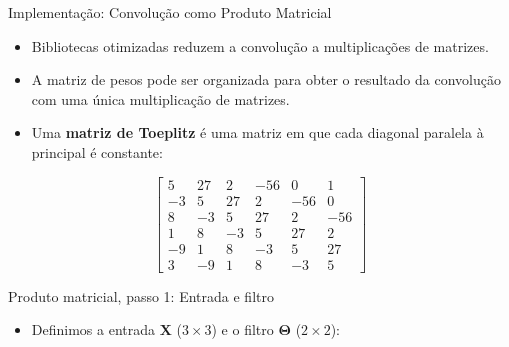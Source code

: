 \documentclass[aspectratio=169,xcolor=dvipsnames]{beamer}
\begin{document}
\begin{frame}{Implementação: Convolução como Produto Matricial}
\begin{itemize}
    \item Bibliotecas otimizadas reduzem a convolução a multiplicações de matrizes.
    \item A matriz de pesos pode ser organizada para obter o resultado da convolução com uma única multiplicação de matrizes.
    \item Uma \textbf{matriz de Toeplitz} é uma matriz em que cada diagonal paralela à principal é constante:
\end{itemize}
\begin{equation*}
\begin{bmatrix}
5 & 27 & 2 & -56 & 0 & 1 \\
-3 & 5 & 27 & 2 & -56 & 0 \\
8 & -3 & 5 & 27 & 2 & -56 \\
1 & 8 & -3 & 5 & 27 & 2 \\
-9 & 1 & 8 & -3 & 5 & 27 \\
3 & -9 & 1 & 8 & -3 & 5
\end{bmatrix}
\end{equation*}
\end{frame}

\begin{frame}{Produto matricial, passo 1: Entrada e filtro}
\begin{itemize}
    \item Definimos a entrada $\mathbf{X}$ ($3\times 3$) e o filtro $\mathbf{\Theta}$ ($2\times 2$):
\end{itemize}
\vspace{0.4em}
\centering
{}
\end{frame}
\end{document}
